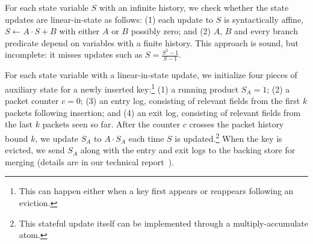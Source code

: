 %

 For each
state variable $S$ with an infinite history, we check whether the state updates
are linear-in-state as follows: (1) each update to $S$ is syntactically affine,
\ie $S \gets A \cdot S + B$ with either $A$ or $B$ possibly zero; and (2) $A$,
$B$ and every branch predicate depend on variables with a finite history. This
approach is sound, but incomplete: it misses updates such as $S = \frac{S^2 -
1}{S - 1}$.

 For each state variable with a
linear-in-state update, we initialize four pieces of auxiliary state for a
newly inserted key:\footnote{This can happen either when a key first appears or
reappears following an eviction.} (1) a running product $S_A = 1$; (2) a packet
counter $c = 0$; (3) an entry log, consisting of relevant fields from the first
$k$ packets following insertion; and (4) an exit log, consisting of relevant
fields from the last $k$ packets seen so far.  After the counter $c$ crosses
the packet history bound $k$, we update $S_A$ to $A \cdot S_A$ each time $S$ is
updated.\footnote{This stateful update itself can be implemented through a
multiply-accumulate atom.} When the key is evicted, we send $S_A$ along with
the entry and exit logs to the backing store for merging (details are in our
technical report~\cite{theory-tr}).
